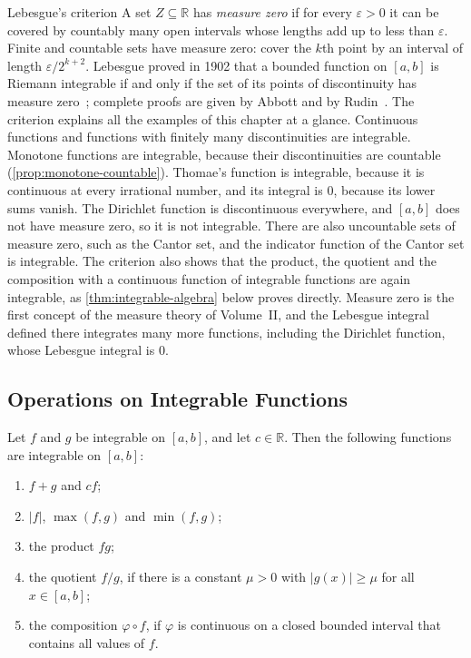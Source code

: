 \begin{note}{Lebesgue's criterion}
A set $Z\subseteq\mathbb R$ has \emph{measure zero} if for every $\varepsilon>0$ it can be covered by countably many open intervals whose lengths add up to less than $\varepsilon$. Finite and countable sets have measure zero: cover the $k$th point by an interval of length $\varepsilon/2^{k+2}$. Lebesgue proved in 1902 that a bounded function on $[a,b]$ is Riemann integrable if and only if the set of its points of discontinuity has measure zero~\cite{lebesgue1902}; complete proofs are given by Abbott and by Rudin~\cite{abbott2015,rudin1976}. The criterion explains all the examples of this chapter at a glance. Continuous functions and functions with finitely many discontinuities are integrable. Monotone functions are integrable, because their discontinuities are countable (\cref{prop:monotone-countable}). Thomae's function is integrable, because it is continuous at every irrational number, and its integral is $0$, because its lower sums vanish. The Dirichlet function is discontinuous everywhere, and $[a,b]$ does not have measure zero, so it is not integrable. There are also uncountable sets of measure zero, such as the Cantor set, and the indicator function of the Cantor set is integrable. The criterion also shows that the product, the quotient and the composition with a continuous function of integrable functions are again integrable, as \cref{thm:integrable-algebra} below proves directly. Measure zero is the first concept of the measure theory of Volume~II, and the Lebesgue integral defined there integrates many more functions, including the Dirichlet function, whose Lebesgue integral is $0$.
\end{note}

\subsection{Operations on Integrable Functions}

\begin{theorem}
\label{thm:integrable-algebra}
Let $f$ and $g$ be integrable on $[a,b]$, and let $c\in\mathbb R$. Then the following functions are integrable on $[a,b]$:
\begin{enumerate}
\item $f+g$ and $cf$;
\item $|f|$, $\max(f,g)$ and $\min(f,g)$;
\item the product $fg$;
\item the quotient $f/g$, if there is a constant $\mu>0$ with $|g(x)|\ge\mu$ for all $x\in[a,b]$;
\item the composition $\varphi\circ f$, if $\varphi$ is continuous on a closed bounded interval that contains all values of $f$.
\end{enumerate}
\end{theorem}

